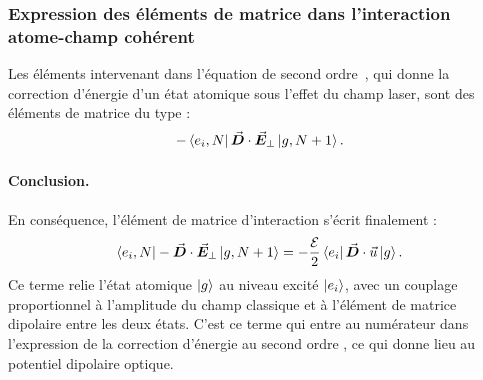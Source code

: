 \subsubsection*{Expression des éléments de matrice dans l’interaction atome-champ cohérent}

Les éléments intervenant dans l’équation de second ordre~, qui donne la correction d’énergie d’un état atomique sous l’effet du champ laser, sont des éléments de matrice du type :
\[
-\bra{e_i, N} \vec{{\bm{D}}} \cdot \vec{{\bm{E}}}_\perp \ket{g, N + 1}.
\]

\paragraph{Conclusion.} En conséquence, l’élément de matrice d’interaction s’écrit finalement :
\[
\bra{e_i, N} - \vec{{\bm{D}}} \cdot \vec{{\bm{E}}}_\perp \ket{g, N + 1} = - \frac{\mathcal{E}}{2} \bra{e_i} \vec{{\bm{D}}} \cdot \vec{u} \ket{g}.
\]
Ce terme relie l’état atomique \( \ket{g} \) au niveau excité \( \ket{e_i} \), avec un couplage proportionnel à l’amplitude du champ classique et à l’élément de matrice dipolaire entre les deux états. C’est ce terme qui entre au numérateur dans l’expression de la correction d’énergie au second ordre , ce qui donne lieu au potentiel dipolaire optique.\\

